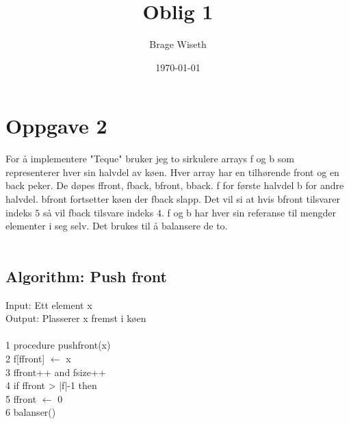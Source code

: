 \documentclass{article}%
\title{Oblig 1}%
\author{Brage Wiseth}%
\date{\today}%
\newcommand{\æ}{\textunderscore}
\newcommand{\å}{\iosevka}
\begin{document}
%
\normalsize%
\iosevka
{\let\newpage\relax\maketitle}
\normalfont
\vspace*{.8cm}
%
%
%
\section*{Oppgave 2}
For å implementere "Teque" bruker jeg to sirkulere arrays {\iosevka f} og {\iosevka b} som representerer hver sin halvdel av køen. Hver array har en tilhørende {\iosevka front} og en {\iosevka back} peker.
De døpes {\iosevka f\textunderscore front, f\textunderscore back, b\textunderscore front, b\textunderscore back}. {\iosevka f} for første halvdel {\iosevka b} for andre halvdel. 
{\iosevka b\textunderscore front} fortsetter køen der {\iosevka f\textunderscore back} slapp.
Det vil si at hvis {\iosevka b\textunderscore front} tilsvarer indeks $5$ så vil {\iosevka f\textunderscore back} tilsvare indeks $4$.
{\iosevka f} og {\iosevka b} har hver sin referanse til mengder elementer i seg selv. Det brukes til å balansere de to.   \\\\
    \begin{minipage}[t]{.48\linewidth}
        \subsection*{Algorithm: Push front} 
        {\sbweight Input:} Ett element {\iosevka x}\\
        {\sbweight Output:} Plasserer {\iosevka x} fremst i køen\\\\
        \iosevka
        \color{darkgray}
        1 procedure push\textunderscore front(x) \\
        2\hspace*{6mm} f[f\textunderscore front] $\leftarrow$  x\\
        3\hspace*{6mm} f\textunderscore front++ and f\æ size++\\
        4\hspace*{6mm} if f\textunderscore front > |f|-1 then\\
        5\hspace*{12mm} f\textunderscore front $\leftarrow$ 0 \\
        6\hspace*{6mm} balanser()
    \end{minipage}
\end{document}
